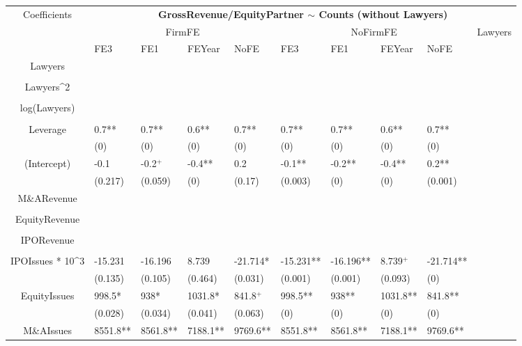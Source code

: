\documentclass{article}
\begin{document}
\begin{table}[H]
\centering
\begin{tabular}{|clllllllll|}
\hline
\multirow{3}{*}{Coefficients} & \multicolumn{9}{c|}{\textbf{GrossRevenue/EquityPartner $\sim$ Counts (without Lawyers)}} \\
\cline{2-10}
& \multicolumn{4}{c}{FirmFE} & \multicolumn{4}{c}{NoFirmFE} & \multirow{2}{*}{Lawyers} \\
\cline{2-9}
& FE3 & FE1 & FEYear & NoFE & FE3 & FE1 & FEYear & NoFE &  \\
\hline
 
Lawyers &  &  &  &  &  &  &  &  & \\ 
   &  &  &  &  &  &  &  &  & \\ 
  Lawyers^2 &  &  &  &  &  &  &  &  & \\ 
   &  &  &  &  &  &  &  &  & \\ 
  log(Lawyers) &  &  &  &  &  &  &  &  & \\ 
   &  &  &  &  &  &  &  &  & \\ 
  Leverage & 0.7** & 0.7** & 0.6** & 0.7** & 0.7** & 0.7** & 0.6** & 0.7** & \\ 
   & (0) & (0) & (0) & (0) & (0) & (0) & (0) & (0) & \\ 
  (Intercept) & -0.1 & -0.2$^{+}$ & -0.4** & 0.2 & -0.1** & -0.2** & -0.4** & 0.2** & \\ 
   & (0.217) & (0.059) & (0) & (0.17) & (0.003) & (0) & (0) & (0.001) & \\ 
  M\&ARevenue &  &  &  &  &  &  &  &  & \\ 
   &  &  &  &  &  &  &  &  & \\ 
  EquityRevenue &  &  &  &  &  &  &  &  & \\ 
   &  &  &  &  &  &  &  &  & \\ 
  IPORevenue &  &  &  &  &  &  &  &  & \\ 
   &  &  &  &  &  &  &  &  & \\ 
  IPOIssues * 10^3 & -15.231 & -16.196 & 8.739 & -21.714* & -15.231** & -16.196** & 8.739$^{+}$ & -21.714** & \\ 
   & (0.135) & (0.105) & (0.464) & (0.031) & (0.001) & (0.001) & (0.093) & (0) & \\ 
  EquityIssues & 998.5* & 938* & 1031.8* & 841.8$^{+}$ & 998.5** & 938** & 1031.8** & 841.8** & \\ 
   & (0.028) & (0.034) & (0.041) & (0.063) & (0) & (0) & (0) & (0) & \\ 
  M\&AIssues & 8551.8** & 8561.8** & 7188.1** & 9769.6** & 8551.8** & 8561.8** & 7188.1** & 9769.6** & \\ 

\end{tabular}
\end{table}
\end{document}

